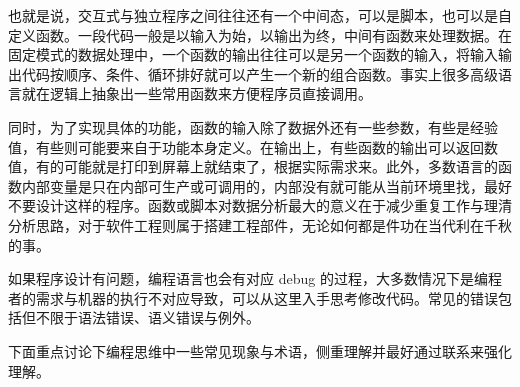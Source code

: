 \documentclass[]{tufte-book}
\begin{document}
也就是说，交互式与独立程序之间往往还有一个中间态，可以是脚本，也可以是自定义函数。一段代码一般是以输入为始，以输出为终，中间有函数来处理数据。在固定模式的数据处理中，一个函数的输出往往可以是另一个函数的输入，将输入输出代码按顺序、条件、循环排好就可以产生一个新的组合函数。事实上很多高级语言就在逻辑上抽象出一些常用函数来方便程序员直接调用。

同时，为了实现具体的功能，函数的输入除了数据外还有一些参数，有些是经验值，有些则可能要来自于功能本身定义。在输出上，有些函数的输出可以返回数值，有的可能就是打印到屏幕上就结束了，根据实际需求来。此外，多数语言的函数内部变量是只在内部可生产或可调用的，内部没有就可能从当前环境里找，最好不要设计这样的程序。函数或脚本对数据分析最大的意义在于减少重复工作与理清分析思路，对于软件工程则属于搭建工程部件，无论如何都是件功在当代利在千秋的事。

如果程序设计有问题，编程语言也会有对应 debug 的过程，大多数情况下是编程者的需求与机器的执行不对应导致，可以从这里入手思考修改代码。常见的错误包括但不限于语法错误、语义错误与例外。

下面重点讨论下编程思维中一些常见现象与术语，侧重理解并最好通过联系来强化理解。
\end{document}
